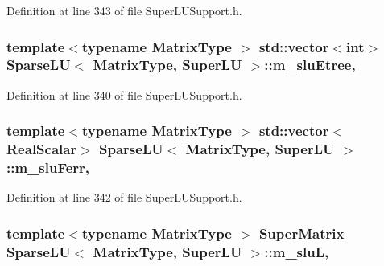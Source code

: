Definition at line 343 of file Super\-L\-U\-Support.\-h.

\hypertarget{class_sparse_l_u_3_01_matrix_type_00_01_super_l_u_01_4_a98713daa0dba9934f94f9562fe8d70bc}{
\subsubsection[{m\-\_\-slu\-Etree}]{\setlength{\rightskip}{0pt plus 5cm}template$<$typename Matrix\-Type $>$ std\-::vector$<${\bf int}$>$ {\bf Sparse\-L\-U}$<$ Matrix\-Type, {\bf Super\-L\-U} $>$\-::m\-\_\-slu\-Etree\hspace{0.3cm}{\ttfamily [mutable]}, {\ttfamily [protected]}}}\label{class_sparse_l_u_3_01_matrix_type_00_01_super_l_u_01_4_a98713daa0dba9934f94f9562fe8d70bc}


Definition at line 340 of file Super\-L\-U\-Support.\-h.

\hypertarget{class_sparse_l_u_3_01_matrix_type_00_01_super_l_u_01_4_aa1556f872d1bb4b8ddcf863995ff39ce}{
\subsubsection[{m\-\_\-slu\-Ferr}]{\setlength{\rightskip}{0pt plus 5cm}template$<$typename Matrix\-Type $>$ std\-::vector$<${\bf Real\-Scalar}$>$ {\bf Sparse\-L\-U}$<$ Matrix\-Type, {\bf Super\-L\-U} $>$\-::m\-\_\-slu\-Ferr\hspace{0.3cm}{\ttfamily [mutable]}, {\ttfamily [protected]}}}\label{class_sparse_l_u_3_01_matrix_type_00_01_super_l_u_01_4_aa1556f872d1bb4b8ddcf863995ff39ce}


Definition at line 342 of file Super\-L\-U\-Support.\-h.

\hypertarget{class_sparse_l_u_3_01_matrix_type_00_01_super_l_u_01_4_acadc22ec35946abdb3ba2a7b23804dac}{
\subsubsection[{m\-\_\-slu\-L}]{\setlength{\rightskip}{0pt plus 5cm}template$<$typename Matrix\-Type $>$ Super\-Matrix {\bf Sparse\-L\-U}$<$ Matrix\-Type, {\bf Super\-L\-U} $>$\-::m\-\_\-slu\-L\hspace{0.3cm}{\ttfamily [mutable]}, {\ttfamily [protected]}}}\label{class_sparse_l_u_3_01_matrix_type_00_01_super_l_u_01_4_acadc22ec35946abdb3ba2a7b23804dac}


